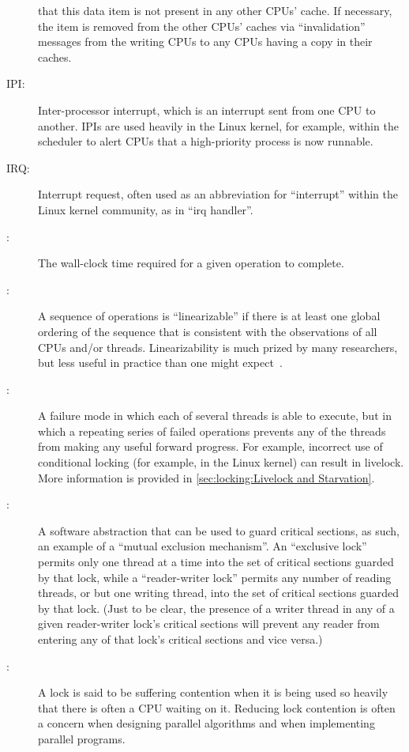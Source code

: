 \begin{description}
	that this data item is not present in any other CPUs' cache.
	If necessary, the item is removed from the other CPUs' caches
	via ``invalidation'' messages from the writing CPUs to any
	CPUs having a copy in their caches.
\item[IPI:]
	Inter-processor interrupt, which is an
	interrupt sent from one CPU to another.
	IPIs are used heavily in the Linux kernel, for example, within
	the scheduler to alert CPUs that a high-priority process is now
	runnable.
\item[IRQ:]
	Interrupt request, often used as an abbreviation for ``interrupt''
	within the Linux kernel community, as in ``irq handler''.
\item[\IXG{Latency}:]
	The wall-clock time required for a given operation to complete.
\item[\IXG{Linearizable}:]
	A sequence of operations is ``linearizable'' if there is at
	least one global ordering of the sequence that is consistent
	with the observations of all CPUs and/or threads.
	Linearizability is much prized by many researchers, but less
	useful in practice than one might
	expect~\cite{AndreasHaas2012FIFOisnt}.
\item[\IXG{Livelock}:]
	A failure mode in which each of several threads is able to
	execute, but in which a repeating series of failed operations
	prevents any of the threads from making any useful forward progress.
	For example, incorrect use of conditional locking
	(for example,  in the Linux kernel)
	can result in livelock.
	More information is provided in
	\cref{sec:locking:Livelock and Starvation}.
\item[\IXG{Lock}:]
	A software abstraction that can be used to guard critical sections,
	as such, an example of a ``mutual exclusion mechanism''.
	An ``exclusive lock'' permits only one thread at a time into the
	set of critical sections guarded by that lock, while a
	``reader-writer lock'' permits any number of reading
	threads, or but one writing thread, into the set of critical
	sections guarded by that lock.
	(Just to be clear, the presence	of a writer thread in any of
	a given reader-writer lock's critical sections will prevent
	any reader from entering any of that lock's critical sections
	and vice versa.)
\item[\IXG{Lock Contention}:]
	A lock is said to be suffering contention when it is being
	used so heavily that there is often a CPU waiting on it.
	Reducing lock contention is often a concern when designing
	parallel algorithms and when implementing parallel programs.

\end{description}
